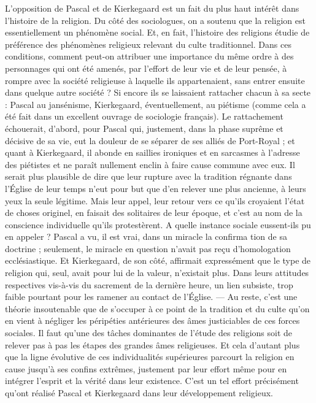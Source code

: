 \documentclass[12pt,a4paper]{article}
\newcommand{\opage}[1]{\marginnote{\footnotesize\textit{[#1]}}}
\begin{document}
L'opposition de Pascal et de Kierkegaard est un fait du plus haut
intérêt dans l'histoire de la religion. Du côté des sociologues, on
a soutenu que la religion est essentiellement un phénomène social.
Et, en fait, l'histoire des religions étudie de préférence des phénomènes
religieux relevant du culte traditionnel. Dans ces conditions,
comment peut-on attribuer une importance du même ordre à des
personnages qui ont été amenés, par l'effort de leur vie et de leur
pensée, à rompre avec la société religieuse à laquelle ils appartenaient,
sans entrer ensuite dans quelque autre société ? Si encore
ils se laissaient rattacher chacun à sa secte : Pascal au jansénisme,
Kierkegaard, éventuellement, au piétisme (comme cela a été fait
dans un excellent ouvrage de sociologie français). Le rattachement
échouerait, d'abord, pour Pascal qui, justement, dans la phase
suprême et décisive de sa vie, eut la douleur de se séparer de ses
alliés de Port-Royal ; et quant à Kierkegaard, il abonde en saillies
ironiques et en sarcasmes à l'adresse des piétistes et ne paraît nullement
enclin à faire cause commune avec eux. Il serait plus plausible
de dire que leur rupture avec la tradition régnante dans
l'Église de leur temps n'eut pour but que d'en relever une plus
ancienne, à leurs yeux la seule légitime. Mais leur appel, leur
retour vers ce qu'ils croyaient l'état de choses originel, en faisait
des solitaires de leur époque, et c'est au nom de la conscience individuelle
qu'ils protestèrent. A quelle instance sociale eussent-ils pu
en appeler ? Pascal a vu, il est vrai, dans un miracle la confirma%
\opage{242}tion de sa doctrine ; seulement, le miracle en question n'avait pas
reçu d'homologation ecclésiastique. Et Kierkegaard, de son côté,
affirmait expressément que le type de religion qui, seul, avait
pour lui de la valeur, n'existait plus. Dans leurs attitudes
respectives vis-à-vis du sacrement de la dernière heure, un lien
subsiste, trop faible pourtant pour les ramener au contact de
l'Église. --- Au reste, c'est une théorie insoutenable que de s'occuper
à ce point de la tradition et du culte qu'on en vient à négliger
les péripéties antérieures des âmes justiciables de ces forces sociales.
Il faut qu'une des tâches dominantes de l'étude des religions soit
de relever pas à pas les étapes des grandes âmes religieuses. Et
cela d'autant plus que la ligne évolutive de ces individualités supérieures
parcourt la religion en cause jusqu'à ses confins extrêmes,
justement par leur effort même pour en intégrer l'esprit et la vérité
dans leur existence. C'est un tel effort précisément qu'ont réalisé
Pascal et Kierkegaard dans leur développement religieux.
\end{document}
